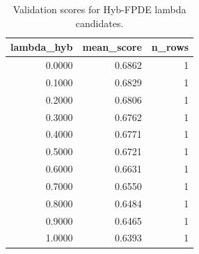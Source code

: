 \begin{table}[t]
\caption{Validation scores for Hyb-FPDE lambda candidates.}
\label{tab:lambda_distribution_computed}
\centering
\begin{tabular}{rrr}
\toprule
lambda\_hyb & mean\_score & n\_rows \\
\midrule
0.0000 & 0.6862 & 1 \\
0.1000 & 0.6829 & 1 \\
0.2000 & 0.6806 & 1 \\
0.3000 & 0.6762 & 1 \\
0.4000 & 0.6771 & 1 \\
0.5000 & 0.6721 & 1 \\
0.6000 & 0.6631 & 1 \\
0.7000 & 0.6550 & 1 \\
0.8000 & 0.6484 & 1 \\
0.9000 & 0.6465 & 1 \\
1.0000 & 0.6393 & 1 \\
\bottomrule
\end{tabular}

\end{table}
